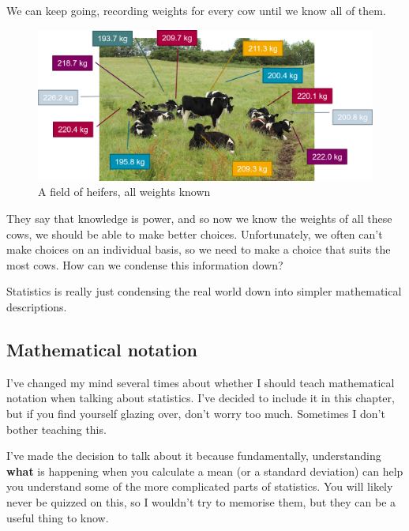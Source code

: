 \documentclass[
]{book}
\begin{document}
We can keep going, recording weights for every cow until we know all of them.

\begin{figure}

{\centering \includegraphics[width=22.28in]{images/09_statbasic/cows_4} 

}

\caption{A field of heifers, all weights known}\label{fig:unnamed-chunk-146}
\end{figure}

They say that knowledge is power, and so now we know the weights of all these cows, we should be able to make better choices. Unfortunately, we often can't make choices on an individual basis, so we need to make a choice that suits the most cows. How can we condense this information down?

Statistics is really just condensing the real world down into simpler mathematical descriptions.

\hypertarget{mathematical-notation}{%
\subsection{Mathematical notation}\label{mathematical-notation}}

I've changed my mind several times about whether I should teach mathematical notation when talking about statistics. I've decided to include it in this chapter, but if you find yourself glazing over, don't worry too much. Sometimes I don't bother teaching this.

I've made the decision to talk about it because fundamentally, understanding \textbf{what} is happening when you calculate a mean (or a standard deviation) can help you understand some of the more complicated parts of statistics. You will likely never be quizzed on this, so I wouldn't try to memorise them, but they can be a useful thing to know.
\end{document}
